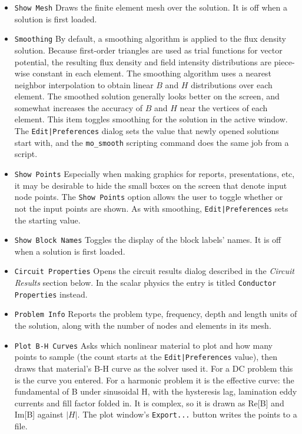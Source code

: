 \documentclass[12pt]{report}
\begin{document}
\begin{itemize}
\item {\tt Show Mesh} Draws the finite element mesh over the solution.  It is
off when a solution is first loaded.
\item {\tt Smoothing} By default, a smoothing algorithm is applied
to the flux density solution.  Because first-order triangles are
used as trial functions for vector potential, the resulting flux
density and field intensity distributions are piece-wise constant
in each element.  The smoothing algorithm uses a nearest neighbor
interpolation to obtain linear $B$ and $H$ distributions over each
element.  The smoothed solution generally looks better on the
screen, and somewhat increases the accuracy of $B$ and $H$ near the
vertices of each element.  This item toggles smoothing for the solution in
the active window.  The {\tt Edit|Preferences} dialog sets the value that
newly opened solutions start with, and the {\tt mo\_smooth} scripting command
does the same job from a script.
\item {\tt Show Points}  Especially when making graphics for
reports, presentations, etc, it may be desirable to hide the small
boxes on the screen that denote input node points.  The {\tt Show
Points} option allows the user to toggle whether or not the input
points are shown.  As with smoothing, {\tt Edit|Preferences} sets the
starting value.
\item {\tt Show Block Names} Toggles the display of the block labels' names.
It is off when a solution is first loaded.
\item {\tt Circuit Properties} Opens the circuit results dialog described in
the {\em Circuit Results} section below.  In the scalar physics the entry is
titled {\tt Conductor Properties} instead.
\item {\tt Problem Info} Reports the problem type, frequency, depth and
length units of the solution, along with the number of nodes and elements in
its mesh.
\item {\tt Plot B-H Curves} Asks which nonlinear material to plot and how
many points to sample (the count starts at the {\tt Edit|Preferences} value),
then draws that material's B-H curve as the solver used it. For a DC problem
this is the curve you entered. For a harmonic problem it is the effective
curve: the fundamental of B under sinusoidal H, with the hysteresis lag,
lamination eddy currents and fill factor folded in. It is complex, so it is
drawn as Re[B] and Im[B] against $|H|$. The plot window's {\tt Export...}
button writes the points to a file.
\end{itemize}
\end{document}

